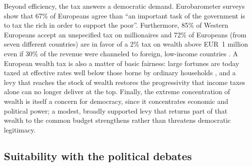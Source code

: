 \documentclass[../../main]{subfiles}
\begin{document}
Beyond efficiency, the tax answers a democratic demand. Eurobarometer surveys show that 67\% of Europeans agree than ``an important task of the government is to tax the rich in order to support the poor''. Furthermore, 85\% of Western Europeans accept an unspecified tax on millionaires \citep{FabreDouenneMattauch2025} and 72\% of Europeans (from seven different countries) are in favor of a 2\% tax on wealth above EUR~1 million even if 30\% of the revenue were channeled to foreign, low-income countries \citep{Fabre2025}. 
A European wealth tax is also a matter of basic fairness: large fortunes are today taxed at effective rates well below those borne by ordinary households \citep{Zucman2024}, and a levy that reaches the stock of wealth restores the progressivity that income taxes alone can no longer deliver at the top. Finally, the extreme concentration of wealth is itself a concern for democracy, since it concentrates economic and political power; a modest, broadly supported levy that returns part of that wealth to the common budget strengthens rather than threatens democratic legitimacy.

\subsection{Suitability with the political debates}
\end{document}
